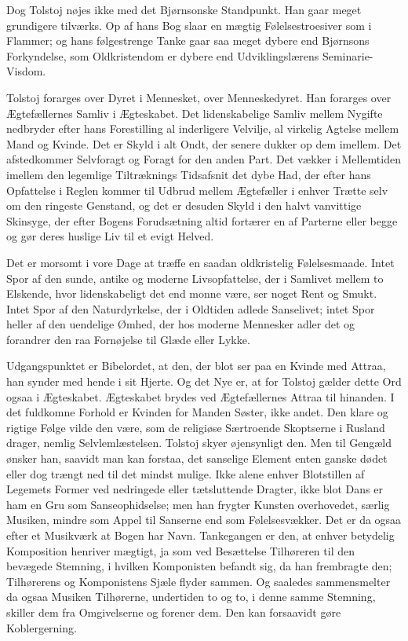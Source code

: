 \documentclass[12pt,a4paper]{article}
\begin{document}
Dog Tolstoj nøjes ikke med det Bjørnsonske Standpunkt. Han gaar meget
grundigere tilværks. Op af hans Bog slaar en mægtig Følelsestroesiver
som i Flammer; og hans følgestrenge Tanke gaar saa meget dybere end
Bjørnsons Forkyndelse, som Oldkristendom er dybere end Udviklingslærens
Seminarie-Visdom.

Tolstoj forarges over Dyret i Mennesket, over Menneskedyret. Han forarges
over Ægtefællernes Samliv i Ægteskabet. Det lidenskabelige Samliv mellem
Nygifte nedbryder efter hans Forestilling al inderligere Velvilje, al
virkelig Agtelse mellem Mand og Kvinde. Det er Skyld i alt Ondt, der
senere dukker op dem imellem. Det afstedkommer Selvforagt og Foragt for
den anden Part. Det vækker i Mellemtiden imellem den legemlige
Tiltræknings Tidsafsnit det dybe Had, der efter hans Opfattelse i Reglen
kommer til Udbrud mellem Ægtefæller i enhver Trætte selv om den ringeste
Genstand, og det er desuden Skyld i den halvt vanvittige Skinsyge, der
efter Bogens Forudsætning altid fortærer en af Parterne eller begge og
gør deres huslige Liv til et evigt Helved.

Det er morsomt i vore Dage at træffe en saadan oldkristelig Følelsesmaade.
Intet Spor af den sunde, antike og moderne Livsopfattelse, der i Samlivet
mellem to Elskende, hvor lidenskabeligt det end monne være, ser noget
Rent og Smukt. Intet Spor af den Naturdyrkelse, der i Oldtiden adlede
Sanselivet; intet Spor heller af den uendelige Ømhed, der hos moderne
Mennesker adler det og forandrer den raa Fornøjelse til Glæde eller Lykke.

Udgangspunktet er Bibelordet, at den, der blot ser paa en Kvinde med
Attraa, han synder med hende i sit Hjerte. Og det Nye er, at for Tolstoj
gælder dette Ord ogsaa i Ægteskabet. Ægteskabet brydes ved Ægtefællernes
Attraa til hinanden. I det fuldkomne Forhold er Kvinden for Manden
Søster, ikke andet. Den klare og rigtige Følge vilde den være, som de
religiøse Særtroende Skoptserne i Rusland drager, nemlig
Selvlemlæstelsen. Tolstoj skyer øjensynligt den. Men til Gengæld ønsker
han, saavidt man kan forstaa, det sanselige Element enten ganske dødet
eller dog trængt ned til det mindst mulige. Ikke alene enhver Blotstillen
af Legemets Former ved nedringede eller tætsluttende Dragter, ikke blot
Dans er ham en Gru som Sanseophidselse; men han frygter Kunsten
overhovedet, særlig Musiken, mindre som Appel til Sanserne end som
Følelsesvækker. Det er da ogsaa efter et Musikværk at Bogen har Navn.
Tankegangen er den, at enhver betydelig Komposition henriver mægtigt, ja
som ved Besættelse Tilhøreren til den bevægede Stemning, i hvilken
Komponisten befandt sig, da han frembragte den; Tilhørerens og
Komponistens Sjæle flyder sammen. Og saaledes sammensmelter da ogsaa
Musiken Tilhørerne, undertiden to og to, i denne samme Stemning, skiller
dem fra Omgivelserne og forener dem. Den kan forsaavidt gøre
Koblergerning.
\end{document}
